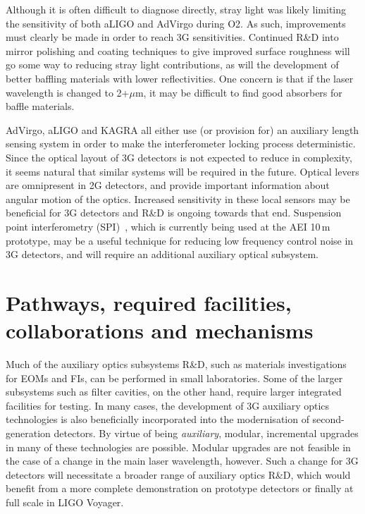 Although it is often difficult to diagnose directly, stray light was likely limiting the sensitivity of both aLIGO and AdVirgo during O2. As such, improvements must clearly be made in order to reach 3G sensitivities. 
Continued R\&D into mirror polishing and coating techniques to give improved surface roughness will go some way to reducing stray light contributions, as will the development of better baffling materials with lower reflectivities. One concern is that if the laser wavelength is changed to 2+$\mu$m, it may be difficult to find good absorbers for baffle materials. 

AdVirgo, aLIGO and KAGRA all either use (or provision for) an auxiliary length sensing system in order to make the interferometer locking process deterministic. Since the optical layout of 3G detectors is not expected to reduce in complexity, it seems natural that similar systems will be required in the future. Optical levers are omnipresent in 2G detectors, and provide important information about angular motion of the optics. Increased sensitivity in these local sensors may be beneficial for 3G detectors
and R\&D is ongoing towards that end. Suspension point interferometry (SPI)~\cite{SPI}, which is currently being used at the AEI 10\,m prototype, may be a useful technique for reducing low frequency control noise in 3G detectors, and will require an additional auxiliary optical subsystem.

\section{Pathways, required facilities, collaborations and mechanisms}

Much of the auxiliary optics subsystems R\&D, such as materials investigations for EOMs and FIs, can be performed in small laboratories. 
Some of the larger subsystems such as filter cavities, on the other hand, require larger integrated facilities for testing. In many cases, the development of 3G auxiliary optics technologies is also beneficially incorporated into the modernisation of second-generation detectors. By virtue of being \emph{auxiliary}, modular, incremental upgrades in many of these technologies are possible. Modular upgrades are not feasible in the case of a change in the main laser wavelength, however. Such a change for 3G detectors will necessitate a broader range of auxiliary optics R\&D, which would benefit from a more complete demonstration on prototype detectors or finally at full scale in LIGO Voyager.

